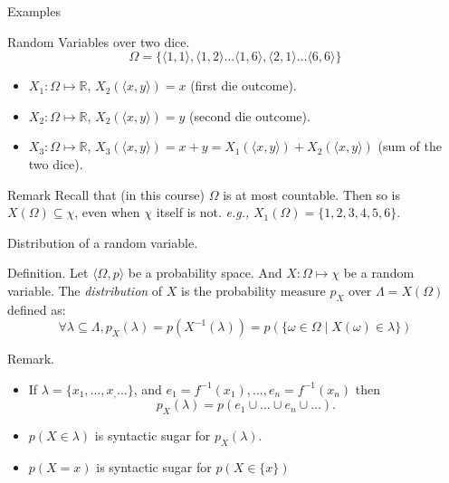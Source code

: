 \documentclass{beamer}
\begin{document}
\begin{frame}{Examples}
  \begin{exampleblock}{Random Variables over two dice.}
    \[\Omega = \{\langle 1,1 \rangle, \langle 1,2 \rangle \dots \langle 1,6 \rangle, \langle 2,1 \rangle \dots \langle 6,6 \rangle\}\]
    \begin{itemize}
    \item $X_1: \Omega \mapsto \mathbb{R}$, $X_2(\langle x,y\rangle) = x$ (first die outcome).
    \item $X_2: \Omega \mapsto \mathbb{R}$, $X_2(\langle x,y \rangle) = y$ (second die outcome).
    \item $X_3: \Omega \mapsto \mathbb{R}$, $X_3(\langle x,y \rangle) = x + y = X_1(\langle x,y\rangle) + X_2(\langle x,y \rangle)$ (sum of the two dice).
    \end{itemize}
  \end{exampleblock}

  \begin{block}{Remark}
    Recall that (in this course)  $\Omega$ is at most countable. Then so is $X(\Omega) \subseteq \chi$, even when $\chi$ itself is not. \emph{e.g.,} $X_1(\Omega) = \{1,2,3,4,5,6\}$.
  \end{block}
  
\end{frame}

\begin{frame}{Distribution of a random variable.}
  \begin{block}{Definition.}
    Let $\langle \Omega, p \rangle$ be a probability space. And $X: \Omega \mapsto \chi$ be a random variable. The \emph{distribution} of $X$ is the probability measure $p_X$ over $\Lambda = X(\Omega)$ defined as:
    \[\forall \lambda \subseteq \Lambda,  p_X(\lambda) = p(X^{-1}(\lambda)) = p(\{\omega \in \Omega \mid X(\omega) \in \lambda\})\]
  \end{block}

  \begin{block}{Remark.}
    \begin{itemize}
    \item    If $\lambda = \{x_1, \dots, x_, \dots \}$, and $e_1 = f^{-1}(x_1), \dots, e_n = f^{-1}(x_n)$ then
      \[p_X(\lambda) = p(e_1 \cup \dots \cup e_n \cup \dots).\]
    \item $p(X \in \lambda)$ is syntactic sugar for  $p_X(\lambda)$.
    \item $p(X = x)$ is syntactic sugar for $p(X \in \{x\})$
    \end{itemize}
  \end{block} 
\end{frame}
\end{document}
